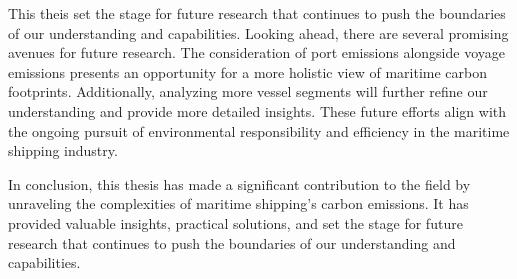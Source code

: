 This theis set the stage for future research that continues to push the boundaries of our understanding and capabilities. 
Looking ahead, there are several promising avenues for future research. 
The consideration of port emissions alongside voyage emissions presents an opportunity for a more holistic view of maritime carbon footprints. 
Additionally, analyzing more vessel segments will further refine our understanding and provide more detailed insights. 
These future efforts align with the ongoing pursuit of environmental responsibility and efficiency in the maritime shipping industry.

In conclusion, this thesis has made a significant contribution to the field by unraveling the complexities of maritime shipping's carbon emissions. 
It has provided valuable insights, practical solutions, and set the stage for future research that continues to push the boundaries of our understanding and capabilities.

